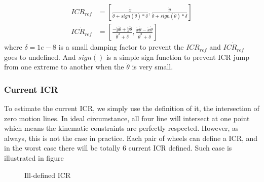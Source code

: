 \begin{equation}\label{eq:ICR_refModified}
    \begin{split}
		 ICR_{ref}&=[\frac{\dot{x}}{\dot{\theta}+sign(\dot{\theta})*\delta} ,\frac{\dot{y}}{\dot{\theta}+sign(\dot{\theta})*\delta}] \\
		 \dot{ICR_{ref}}&=[\frac{-\ddot{y}\dot{\theta}+\dot{y}\ddot{\theta}}{\dot{\theta}^2+\delta},\frac{\ddot{x}\dot{\theta}-\dot{x}\ddot{\theta}}{\dot{\theta}^2+\delta}]
    \end{split}
\end{equation}
where $\delta=1e-8$ is a small damping factor to prevent the $ICR_{ref}$ and $\dot{ICR_{ref}}$ goes to undefined. And $sign()$ is a simple sign function to prevent ICR jump from one extreme to another when the $\dot{\theta}$ is very small.

\subsubsection{Current ICR}
To estimate the current ICR, we simply use the definition of it, the intersection of zero motion lines. In ideal circumstance, all four line will intersect at one point which means the kinematic constraints are 
perfectly respected. However, as always, this is not the case in practice. Each pair of wheels can define a ICR, and in the worst case there will be totally 6 current ICR defined. Such case is illustrated in figure 

\begin{figure}[t]\label{fig:illDefinedICR}
	\begin{center}
	\resizebox{10cm}{!}
    {
		}
	\end{center}
	\caption{Ill-defined ICR}
\end{figure}



